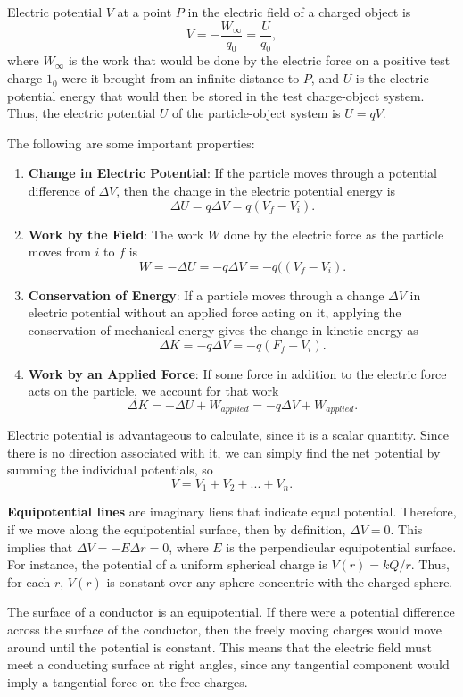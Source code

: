 \documentclass[11pt]{article}
\theoremstyle{plain} %
\theoremstyle{definition}
\theoremstyle{example}
\theoremstyle{remark}
\begin{document}
Electric potential $V$ at a point $P$ in the electric field of a charged object is 
$$V = -\frac{W_{\infty}}{q_0} = \frac{U}{q_0},$$
where $W_{\infty}$ is the work that would be done by the electric force on a positive test charge $1_0$ were it brought from an infinite distance to $P$, and $U$ is the electric potential energy that would then be stored in the test charge-object system. Thus, the electric potential $U$ of the particle-object system is $U = qV.$

The following are some important properties:
\begin{enumerate}
	\item \textbf{Change in Electric Potential}: If the particle moves through a potential difference of $\Delta V$, then the change in the electric potential energy is 
	$$\Delta U = q\Delta V = q(V_f-V_i).$$
	\item \textbf{Work by the Field}: The work $W$ done by the electric force as the particle moves from $i$ to $f$ is $$W = -\Delta U = -q\Delta V  = -q((V_f - V_i).$$
	\item \textbf{Conservation of Energy}: If a particle moves through a change $\Delta V$ in electric potential without an applied force acting on it, applying the conservation of mechanical energy gives the change in kinetic energy as $$\Delta K = -q\Delta V = -q(F_f - V_i).$$
	\item \textbf{Work by an Applied Force}: If some force in addition to the electric force acts on the particle, we account for that work 
	$$\Delta K = -\Delta U + W_{applied} = -q\Delta V + W_{applied}.$$
\end{enumerate}

Electric potential is advantageous to calculate, since it is a scalar quantity. Since there is no direction associated with it, we can simply find the net potential by summing the individual potentials, so 
$$V = V_1 + V_2 + ...+V_n.$$

\textbf{Equipotential lines} are imaginary liens that indicate equal potential. Therefore, if we move along the equipotential surface, then by definition, $\Delta V = 0$. This implies that $\Delta V = -E \Delta r =0 $, where $E$ is the perpendicular equipotential surface. For instance, the potential of a uniform spherical charge is $V(r) = kQ/r$. Thus, for each $r$, $V(r)$ is constant over any sphere concentric with the charged sphere. 

The surface of a conductor is an equipotential. If there were a potential difference across the surface of the conductor, then the freely moving charges would move around until the potential is constant. This means that the electric field must meet a conducting surface at right angles, since any tangential component would imply a tangential force on the free charges.
\end{document}
